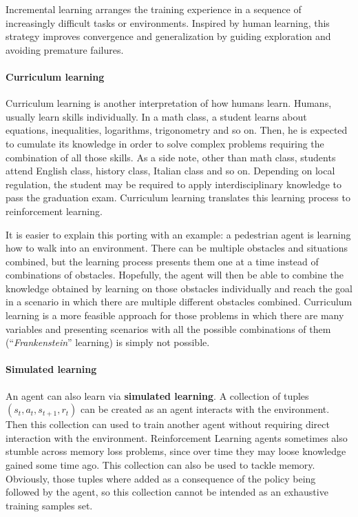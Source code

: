 Incremental learning arranges the training experience in a sequence of increasingly difficult tasks or environments.
Inspired by human learning, this strategy improves convergence and generalization by guiding exploration and avoiding premature failures.

\paragraph{Curriculum learning}

Curriculum learning is another interpretation of how humans learn.
Humans, usually learn skills individually. In a math class, a student learns about equations, inequalities, logarithms, trigonometry and so on. Then, he is expected to cumulate its knowledge in order to solve complex problems requiring the combination of all those skills. As a side note, other than math class, students attend English class, history class, Italian class and so on. Depending on local regulation, the student may be required to apply interdisciplinary knowledge to pass the graduation exam.
Curriculum learning translates this learning process to reinforcement learning.

It is easier to explain this porting with an example: a pedestrian agent is learning how to walk into an environment.
There can be multiple obstacles and situations combined, but the learning process presents them one at a time instead of combinations of obstacles.
Hopefully, the agent will then be able to combine the knowledge obtained by learning on those obstacles individually and reach the goal in a scenario in which there are multiple different obstacles combined.
Curriculum learning is a more feasible approach for those problems in which there are many variables and presenting scenarios with all the possible combinations of them (``\textit{Frankenstein}'' learning) is simply not possible.

\paragraph{Simulated learning}

An agent can also learn via \textbf{simulated learning}.
A collection of tuples $(s_t, a_t, s_{t+1}, r_t)$ can be created as an agent interacts with the environment.
Then this collection can used to train another agent without requiring direct interaction with the environment.
Reinforcement Learning agents sometimes also stumble across memory loss problems, since over time they may loose knowledge gained some time ago.
This collection can also be used to tackle memory.
Obviously, those tuples where added as a consequence of the policy being followed by the agent, so this collection cannot be intended as an exhaustive training samples set.
